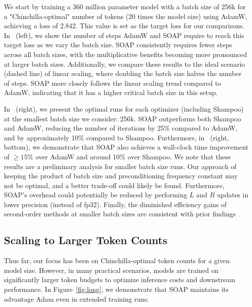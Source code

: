 \documentclass{article} %
\begin{document}
We start by training a 360 million parameter model with a batch size of 256k for a "Chinchilla-optimal" number of tokens (20 times the model size) using AdamW, achieving a loss of 2.842. This value is set as the target loss for our comparisons. In~ (left), we show the number of steps AdamW and SOAP require to reach this target loss as we vary the batch size. SOAP consistently requires fewer steps across all batch sizes, with the multiplicative benefits becoming more pronounced at larger batch sizes. Additionally, we compare these results to the ideal scenario (dashed line) of linear scaling, where doubling the batch size halves the number of steps. SOAP more closely follows the linear scaling trend compared to AdamW, indicating that it has a higher critical batch size in this setup.


In~ (right), we present the optimal runs for each optimizer (including Shampoo) at the smallest batch size we consider: 256k. SOAP outperforms both Shampoo and AdamW, reducing the number of iterations by 25\% compared to AdamW, and by approximately 10\% compared to Shampoo. Furthermore, in~ (right, bottom), we demonstrate that SOAP also achieves a wall-clock time improvement of $\geq 15\%$ over AdamW and around 10\% over Shampoo. We note that these results are a preliminary analysis for smaller batch size runs. Our approach of keeping the product of batch size and preconditioning frequency constant may not be optimal, and a better trade-off could likely be found. Furthermore, SOAP’s overhead could potentially be reduced by performing $L$ and $R$ updates in lower precision (instead of fp32). Finally, the diminished efficiency gains of second-order methods at smaller batch sizes are consistent with prior findings~\citep{nqm,ishikawa2024when}.






\subsection{Scaling to Larger Token Counts}
\label{sec:long}

Thus far, our focus has been on Chinchilla-optimal token counts for a given model size. However, in many practical scenarios, models are trained on significantly larger token budgets to optimize inference costs and downstream performance. In Figure~\ref{fig:long}, we demonstrate that SOAP maintains its advantage Adam even in extended training runs.
\end{document}
